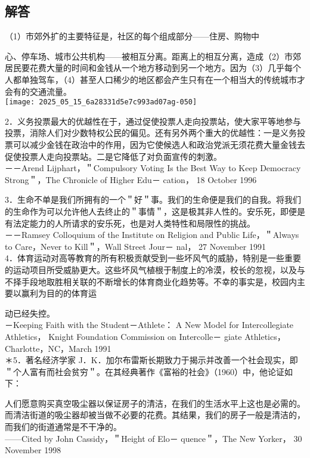 \subsection{解答}
（1）市郊外扩的主要特征是，社区的每个组成部分——住房、购物中

心、停车场、城市公共机构——被相互分离。距离上的相互分离，造成（2）市郊居民要花费大量的时间和金钱从一个地方移动到另一个地方。因为（3）几乎每个人都单独驾车，（4）甚至人口稀少的地区都会产生只有在一个相当大的传统城市才会有的交通流量。\\
\texttt{[image: 2025\_05\_15\_6a28331d5e7c993ad07ag-050]}

2．义务投票最大的优越性在于，通过促使投票人走向投票站，使大家平等地参与投票，消除人们对少数特权公民的偏见。还有另外两个重大的优越性：一是义务投票可以减少金钱在政治中的作用，因为它使候选人和政治党派无须花费大量金钱去促使投票人走向投票站。二是它降低了对负面宣传的刺激。\\
－－Arend Lijphart，＂Compulsory Voting Is the Best Way to Keep Democracy Strong＂，The Chronicle of Higher Edu－ cation， 18 October 1996

3．生命不单是我们所拥有的一个＂好＂事。我们的生命便是我们的自我。将我们的生命作为可以允许他人去终止的＂事情＂，这是极其非人性的。安乐死，即便是有法定能力的人所请求的安乐死，也是对人类特性和局限性的挑战。\\
－－Ramsey Colloquium of the Institute on Religion and Public Life，＂Always to Care，Never to Kill＂，Wall Street Jour－ nal， 27 November 1991\\
4．体育运动对高等教育的所有积极贡献受到一些坏风气的威胁，特别是一些重要的运动项目所受威胁更大。这些坏风气植根于制度上的冷漠，校长的忽视，以及与不择手段地取胜相关联的不断增长的体育商业化趋势等。不幸的事实是，校园内主要以赢利为目的的体育运

动已经失控。\\
－Keeping Faith with the Student－Athlete： A New Model for Intercollegiate Athletics， Knight Foundation Commission on Intercolle－ giate Athletics，Charlotte，NC，March 1991\\
＊5．著名经济学家 J．K．加尔布雷斯长期致力于揭示并改善一个社会现实，即＂个人富有而社会贫穷＂。在其经典著作《富裕的社会》（1960）中，他论证如下：

人们愿意购买真空吸尘器以保证房子的清洁，在我们的生活水平上这也是必需的。而清洁街道的吸尘器却被当做不必要的花费。其结果，我们的房子一般是清洁的，而我们的街道通常是不干净的。\\
——Cited by John Cassidy，＂Height of Elo－ quence＂，The New Yorker， 30 November 1998

